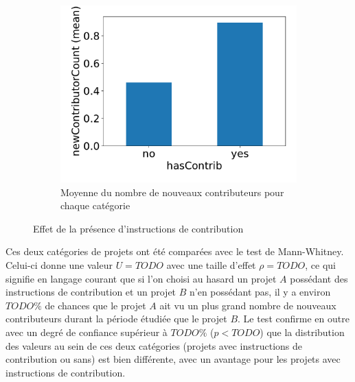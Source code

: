 \begin{figure}
    \begin{subfigure}[t]{0.8\textwidth}
        \includegraphics[width=\textwidth]{experiment/data_analysis/hasContrib_meanNewContributorCount}
        \caption{Moyenne du nombre de nouveaux contributeurs pour chaque catégorie}
    \end{subfigure}

    
    \caption{Effet de la présence d'instructions de contribution}
    \label{fig:hasContrib}
\end{figure}

Ces deux catégories de projets ont été comparées avec le test de Mann-Whitney. Celui-ci donne une valeur $U =
TODO$ avec une taille d'effet $ρ = TODO$, ce qui signifie en langage courant que si l'on choisi au hasard un
projet $A$ possédant des instructions de contribution et un projet $B$ n'en possédant pas, il y a environ
$TODO\%$ de chances que le projet $A$ ait vu un plus grand nombre de nouveaux contributeurs durant la période
étudiée que le projet $B$. Le test confirme en outre avec un degré de confiance supérieur à $TODO\%$ ($p <
TODO$) que la distribution des valeurs au sein de ces deux catégories (projets avec instructions de
contribution ou sans) est bien différente, avec un avantage pour les projets avec instructions de
contribution.

